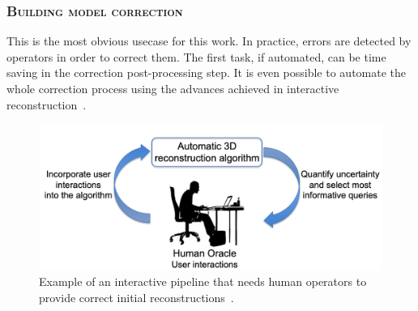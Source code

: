         \subsubsection{\textsc{Building model correction}}
            This is the most obvious usecase for this work.
            In practice, errors are detected by operators in order to correct them.
            The first task, if automated, can be time saving in the correction post-processing step.
            It is even possible to automate the whole correction process using the advances achieved in interactive reconstruction~\parencite{kowdle2011active}.
            \begin{figure}[htpb]
                \centering
                \includegraphics[width=.7\textwidth]{images/introduction/use/active_learning_kowdle}
                \caption{\label{fig::corrections} Example of an interactive pipeline that needs human operators to provide correct initial reconstructions~\parencite{kowdle2011active}.}
            \end{figure}

